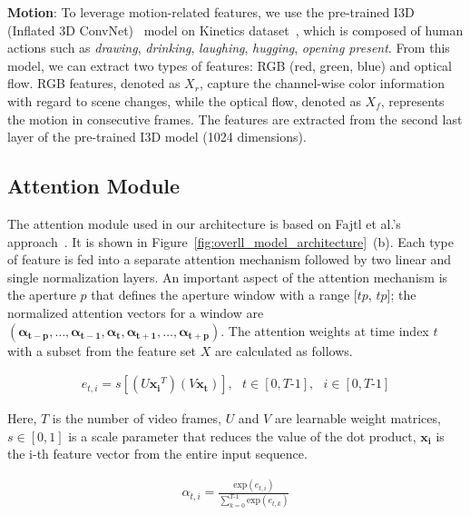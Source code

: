 \documentclass{article}
\begin{document}
\noindent
\textbf{Motion}: To leverage motion-related features, we use the pre-trained I3D (Inflated 3D ConvNet)~\cite{DBLP:conf/cvpr/CarreiraZ17} model on Kinetics dataset~\cite{kinetics_dataset}, which is composed of human actions such as \textit{drawing}, \textit{drinking}, \textit{laughing}, \textit{hugging}, \textit{opening present}. From this model, we can extract two types of features: RGB (red, green, blue) and optical flow. RGB features, denoted as $X_r$, capture the channel-wise color information with regard to scene changes, while the optical flow, denoted as $X_f$, represents the motion in consecutive frames. The features are extracted from the second last layer of the pre-trained I3D model (\num{1024} dimensions).

\subsection{Attention Module}
The attention module used in our architecture is based on Fajtl et al.'s approach~\cite{DBLP:conf/accv/FajtlSAMR18}. It is shown in Figure~\ref{fig:overll_model_architecture}~(b). Each type of feature is fed into a separate attention mechanism followed by two linear and single normalization layers. An important aspect of the attention mechanism is the aperture $p$ that defines the aperture window with a range [$t$\text{-}$p$, $t$\text{+}$p$]; the normalized attention vectors for a window are $(\mathbf{\alpha_{t-p}},\dots,\mathbf{\alpha_{t-1}},\mathbf{\alpha_{t}},\mathbf{\alpha_{t+1}},\dots,\mathbf{\alpha_{t+p}})$. The attention weights at time index $t$ with a subset from the feature set $X$ are calculated as follows.

					 
\begin{gather}
e_{t,i} = s[(U\mathbf{x_{i}}^T) (V\mathbf{x_{t}})], 
  \text{    }
t \in [0,T\text{-}1],
\text{    }
i \in [0, T\text{-}1]
\end{gather}

			 
							   
			  


																																																										 

			  
																					   
Here, $T$ is the number of video frames, $U$ and $V$ are learnable weight matrices, $s\in[0,1]$ is a scale parameter that reduces the value of the dot product, $\mathbf{x_i}$ is the i-th feature vector from the entire input sequence.

\begin{gather}
\alpha_{t,i} = \frac{\text{exp}(e_{t,i})}{\sum_{k=0}^{T\text{-}1} \text{exp} (e_{t,k})}
\end{gather}
\end{document}
